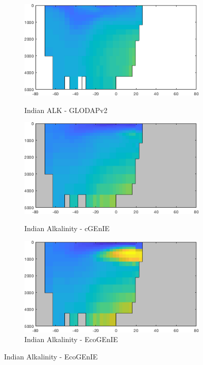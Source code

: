 \documentclass{article}
\begin{document}
\begin{figure}[htp]
\begin{subfigure}{.33\textwidth}
 \label{fig:nutrients2}
\end{subfigure}
\begin{subfigure}{.33\textwidth}
 \caption{Indian ALK - GLODAPv2}
 \includegraphics[width=0.95\linewidth]{../Separate_figures/OBSERVATIONS/Indian_TALK_profile.png}
 \label{fig:nutrients1}
\end{subfigure}%
\begin{subfigure}{.33\textwidth}
 \caption{Indian Alkalinity - cGEnIE}
 \includegraphics[width=0.95\linewidth]{../Separate_figures/BIOGEM/Indian_ocn_ALK_profile.png}
 \label{fig:nutrients1}
\end{subfigure}%
\begin{subfigure}{.33\textwidth}
 \caption{Indian Alkalinity - EcoGEnIE}
 \includegraphics[width=0.95\linewidth]{../Separate_figures/ECOGEM/Indian_ocn_ALK_profile.png}

\end{subfigure}
\end{figure}
\end{document}

